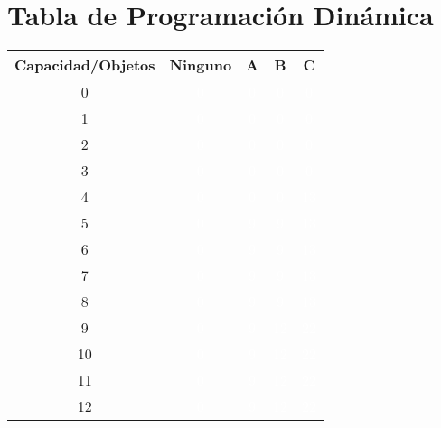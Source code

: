 \documentclass{article}
\begin{document}
\section*{Tabla de Programación Dinámica}
\begin{center}
\scriptsize
\begin{tabular}{|c|c|c|c|c|}
\hline
Capacidad/Objetos & Ninguno & A & B & C \\ \hline
0 & \cellcolor{rojo}\textcolor{white}{0} & \cellcolor{rojo}\textcolor{white}{0} & \cellcolor{rojo}\textcolor{white}{0} & \cellcolor{rojo}\textcolor{white}{0} \\ \hline
1 & \cellcolor{rojo}\textcolor{white}{0} & \cellcolor{rojo}\textcolor{white}{0} & \cellcolor{rojo}\textcolor{white}{0} & \cellcolor{rojo}\textcolor{white}{0} \\ \hline
2 & \cellcolor{rojo}\textcolor{white}{0} & \cellcolor{rojo}\textcolor{white}{0} & \cellcolor{rojo}\textcolor{white}{0} & \cellcolor{rojo}\textcolor{white}{0} \\ \hline
3 & \cellcolor{rojo}\textcolor{white}{0} & \cellcolor{rojo}\textcolor{white}{0} & \cellcolor{rojo}\textcolor{white}{0} & \cellcolor{rojo}\textcolor{white}{0} \\ \hline
4 & \cellcolor{rojo}\textcolor{white}{0} & \cellcolor{rojo}\textcolor{white}{0} & \cellcolor{rojo}\textcolor{white}{0} & \cellcolor{verde}\textcolor{white}{13} \\ \hline
5 & \cellcolor{rojo}\textcolor{white}{0} & \cellcolor{verde}\textcolor{white}{9} & \cellcolor{rojo}\textcolor{white}{9} & \cellcolor{verde}\textcolor{white}{13} \\ \hline
6 & \cellcolor{rojo}\textcolor{white}{0} & \cellcolor{verde}\textcolor{white}{9} & \cellcolor{rojo}\textcolor{white}{9} & \cellcolor{verde}\textcolor{white}{13} \\ \hline
7 & \cellcolor{rojo}\textcolor{white}{0} & \cellcolor{verde}\textcolor{white}{9} & \cellcolor{rojo}\textcolor{white}{9} & \cellcolor{verde}\textcolor{white}{13} \\ \hline
8 & \cellcolor{rojo}\textcolor{white}{0} & \cellcolor{verde}\textcolor{white}{9} & \cellcolor{rojo}\textcolor{white}{9} & \cellcolor{verde}\textcolor{white}{13} \\ \hline
9 & \cellcolor{rojo}\textcolor{white}{0} & \cellcolor{verde}\textcolor{white}{9} & \cellcolor{verde}\textcolor{white}{12} & \cellcolor{verde}\textcolor{white}{22} \\ \hline
10 & \cellcolor{rojo}\textcolor{white}{0} & \cellcolor{verde}\textcolor{white}{9} & \cellcolor{verde}\textcolor{white}{12} & \cellcolor{verde}\textcolor{white}{22} \\ \hline
11 & \cellcolor{rojo}\textcolor{white}{0} & \cellcolor{verde}\textcolor{white}{9} & \cellcolor{verde}\textcolor{white}{12} & \cellcolor{verde}\textcolor{white}{22} \\ \hline
12 & \cellcolor{rojo}\textcolor{white}{0} & \cellcolor{verde}\textcolor{white}{9} & \cellcolor{verde}\textcolor{white}{12} & \cellcolor{verde}\textcolor{white}{22} \\ \hline
\end{tabular}
\end{center}
\normalsize
\end{document}
